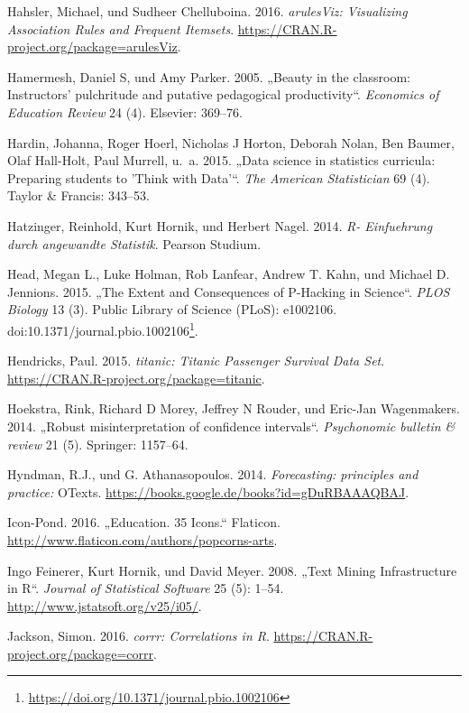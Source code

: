 \documentclass[12pt,ngerman,]{book}
\let\rmarkdownfootnote\footnote%
\def\footnote{\protect\rmarkdownfootnote}
\renewcommand{\href}[2]{#2\footnote{\url{#1}}}
\theoremstyle{definition}
\theoremstyle{definition}
\theoremstyle{remark}
\begin{document}
\hypertarget{ref-R-arulesViz}{}
Hahsler, Michael, und Sudheer Chelluboina. 2016. \emph{arulesViz:
Visualizing Association Rules and Frequent Itemsets}.
\url{https://CRAN.R-project.org/package=arulesViz}.

\hypertarget{ref-hamermesh2005beauty}{}
Hamermesh, Daniel S, und Amy Parker. 2005. „Beauty in the classroom:
Instructors' pulchritude and putative pedagogical productivity``.
\emph{Economics of Education Review} 24 (4). Elsevier: 369--76.

\hypertarget{ref-hardin2015data}{}
Hardin, Johanna, Roger Hoerl, Nicholas J Horton, Deborah Nolan, Ben
Baumer, Olaf Hall-Holt, Paul Murrell, u.~a. 2015. „Data science in
statistics curricula: Preparing students to 'Think with Data'``.
\emph{The American Statistician} 69 (4). Taylor \& Francis: 343--53.

\hypertarget{ref-Hatzinger}{}
Hatzinger, Reinhold, Kurt Hornik, und Herbert Nagel. 2014. \emph{R-
Einfuehrung durch angewandte Statistik}. Pearson Studium.

\hypertarget{ref-Head2015}{}
Head, Megan L., Luke Holman, Rob Lanfear, Andrew T. Kahn, und Michael D.
Jennions. 2015. „The Extent and Consequences of P-Hacking in Science``.
\emph{PLOS Biology} 13 (3). Public Library of Science (PLoS): e1002106.
doi:\href{https://doi.org/10.1371/journal.pbio.1002106}{10.1371/journal.pbio.1002106}.

\hypertarget{ref-R-titanic}{}
Hendricks, Paul. 2015. \emph{titanic: Titanic Passenger Survival Data
Set}. \url{https://CRAN.R-project.org/package=titanic}.

\hypertarget{ref-hoekstra2014robust}{}
Hoekstra, Rink, Richard D Morey, Jeffrey N Rouder, und Eric-Jan
Wagenmakers. 2014. „Robust misinterpretation of confidence intervals``.
\emph{Psychonomic bulletin \& review} 21 (5). Springer: 1157--64.

\hypertarget{ref-hyndman2014forecasting}{}
Hyndman, R.J., und G. Athanasopoulos. 2014. \emph{Forecasting:
principles and practice:} OTexts.
\url{https://books.google.de/books?id=gDuRBAAAQBAJ}.

\hypertarget{ref-edu_icons}{}
Icon-Pond. 2016. „Education. 35 Icons.`` Flaticon.
\url{http://www.flaticon.com/authors/popcorns-arts}.

\hypertarget{ref-tm}{}
Ingo Feinerer, Kurt Hornik, und David Meyer. 2008. „Text Mining
Infrastructure in R``. \emph{Journal of Statistical Software} 25 (5):
1--54. \url{http://www.jstatsoft.org/v25/i05/}.

\hypertarget{ref-R-corrr}{}
Jackson, Simon. 2016. \emph{corrr: Correlations in R}.
\url{https://CRAN.R-project.org/package=corrr}.
\end{document}
